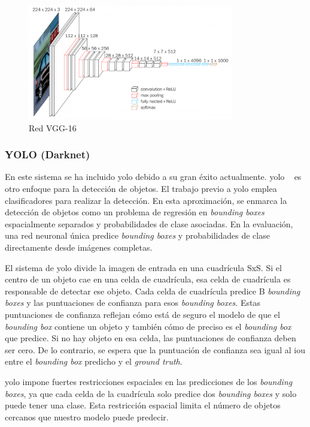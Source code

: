  \begin{figure}[H] 
\begin{center}
	\includegraphics[width=0.8\textwidth]{figures/Diseno_global/vgg16.png}
   \caption{Red VGG-16}
	\label{fig.vgg16}
\end{center}
\end{figure}

\subsubsection{YOLO (Darknet)}

En este sistema se ha incluido \acrfull{yolo} debido a su gran éxito actualmente. \acrshort{yolo} ~\cite{yolo_article1} es otro enfoque para la detección de objetos. El trabajo previo a \acrshort{yolo} emplea clasificadores para realizar la detección. En esta aproximación, se enmarca la detección de objetos como un problema de regresión en \textit{bounding boxes} espacialmente separados y probabilidades de clase asociadas. En la evaluación, una red neuronal única predice \textit{bounding boxes} y probabilidades de clase directamente desde imágenes completas. 

El sistema de \acrshort{yolo} divide la imagen de entrada en una cuadrícula SxS. Si el centro de un objeto cae en una celda de cuadrícula, esa celda de cuadrícula es responsable de detectar ese objeto. Cada celda de cuadrícula predice B \textit{bounding boxes} y las puntuaciones de confianza para esos \textit{bounding boxes}. Estas puntuaciones de confianza reflejan cómo está de seguro el modelo de que el \textit{bounding box} contiene un objeto y también cómo de preciso es el \textit{bounding box} que predice. Si no hay objeto en esa celda, las puntuaciones de confianza deben ser cero. De lo contrario, se espera que la puntuación de confianza sea igual al \acrfull{iou} entre el \textit{bounding box} predicho y el \textit{ground truth}.

\acrshort{yolo} impone fuertes restricciones espaciales en las predicciones de los \textit{bounding boxes}, ya que cada celda de la cuadrícula solo predice dos \textit{bounding boxes} y solo puede tener una clase. Esta restricción espacial limita el número de objetos cercanos que nuestro modelo puede predecir. 

